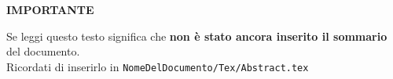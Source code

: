 \begin{center}
	\Huge \textbf{IMPORTANTE}
\end{center}

\Large

Se leggi questo testo significa che \textbf{non è stato ancora inserito il sommario} del documento. \\
Ricordati di inserirlo in \texttt{NomeDelDocumento/Tex/Abstract.tex}
